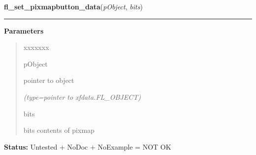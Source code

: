     \label{xformslib:library:fl_set_pixmap_data}

    \vspace{0.5ex}

\hspace{.8\funcindent}\begin{boxedminipage}{\funcwidth}

    \raggedright \textbf{fl\_set\_pixmapbutton\_data}(\textit{pObject}, \textit{bits})

    \vspace{-1.5ex}

    \rule{\textwidth}{0.5\fboxrule}
\setlength{\parskip}{2ex}
\setlength{\parskip}{1ex}
      \textbf{Parameters}
      \vspace{-1ex}

      \begin{quote}
        \begin{Ventry}{xxxxxxx}

          \item[pObject]

          pointer to object

            {\it (type=pointer to xfdata.FL\_OBJECT)}

          \item[bits]

          bits contents of pixmap

        \end{Ventry}

      \end{quote}

\textbf{Status:} Untested + NoDoc + NoExample = NOT OK



    \end{boxedminipage}

    \label{xformslib:library:fl_set_pixmapbutton_focus_outline}

    \vspace{0.5ex}

